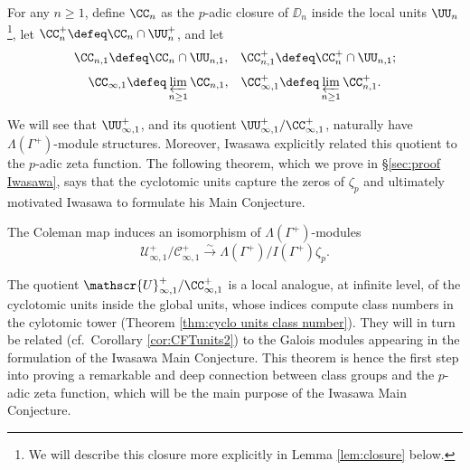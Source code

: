 \documentclass[a4paper,10pt, english, reqno]{smfart}
\newcommand{\GG}{\Gamma}
\numberwithin{equation}{section}
\begin{document}

\begin{definition} For any $n \geq 1$, define $\CC_n$ as the $p$-adic closure of $\DD_n$ inside the local units $\UU_n$\footnote{ We will describe this closure more explicitly in Lemma \ref{lem:closure} below.}, let $\CC^+_n \defeq \CC_n \cap \UU_n^+$, and let
	\[ \CC_{n, 1} \defeq \CC_n \cap \UU_{n, 1}, \;\;\; \CC^+_{n, 1} \defeq \CC^+_n \cap \UU_{n, 1}; \]
	\[ \CC_{\infty, 1} \defeq \varprojlim_{n \geq 1} \CC_{n, 1}, \;\;\; \CC^+_{\infty, 1} \defeq \varprojlim_{n \geq 1} \CC^+_{n, 1}. \]

\end{definition}

We will see that $\UU_{\infty,1}^+$, and its quotient $\UU_{\infty,1}^+/\CC_{\infty,1}^+$, naturally have $\Lambda(\GG^+)$-module structures. Moreover, Iwasawa explicitly related this quotient to the $p$-adic zeta function. The following theorem, which we prove in \S\ref{sec:proof Iwasawa}, says that the cyclotomic units capture the zeros of $\zeta_p$ and ultimately motivated Iwasawa to formulate his Main Conjecture.

\begin{theorem} \label{thm:iwasawa}
The Coleman map induces an isomorphism of $\Lambda(\GG^+)$-modules
		\[ 
		\mathscr{U}^+_{\infty, 1} / \mathscr{C}^+_{\infty, 1} \xrightarrow{\sim} \Lambda(\GG^+) / I(\GG^+) \zeta_p. 
		\]
\end{theorem}

The quotient $\mathscr{U}_{\infty,1}^+/\CC_{\infty,1}^+$ is a local analogue, at infinite level, of the cyclotomic units inside the global units, whose indices compute class numbers in the cylotomic tower (Theorem \ref{thm:cyclo units class number}).  They will in turn be related (cf.\ Corollary \ref{cor:CFTunits2}) to the Galois modules appearing in the formulation of the Iwasawa Main Conjecture. This theorem is hence the first step into proving a remarkable and deep connection between class groups and the $p$-adic zeta function, which will be the main purpose of the Iwasawa Main Conjecture. 
\end{document}

